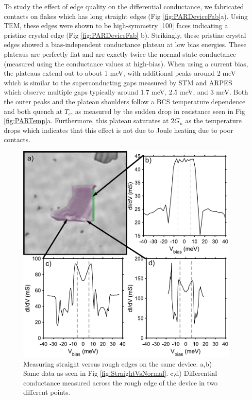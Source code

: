 To study the effect of edge quality on the differential conductance, we fabricated contacts on flakes which has long straight edges (Fig \ref{fig:PARDeviceFab}a). Using TEM, these edges were shown to be high-symmetry [100] faces indicating a pristine crystal edge (Fig \ref{fig:PARDeviceFab} b). Strikingly, these pristine crystal edges showed a bias-independent conductance plateau at low bias energies. These plateaus are perfectly flat and are exactly twice the normal-state conductance (measured using the conductance values at high-bias). When using a current bias, the plateaus extend out to about 1 meV, with additional peaks around 2 meV which is similar to the superconducting gaps measured by \ac{STM} and \ac{ARPES} which observe multiple gaps typically around 1.7 meV, 2.5 meV, and 3 meV\cite{Zhang2018, Zhu2020}. Both the outer peaks and the plateau shoulders follow a \ac{BCS} temperature dependence and both quench at $T_{c}$, as measured by the sudden drop in resistance seen in Fig \ref{fig:PARTemp}a. Furthermore, this plateau saturates at $2G_{n}$ as the temperature drops which indicates that this effect is not due to Joule heating due to poor contacts.\par
\begin{figure}
	\centering
	\includegraphics[width=\textwidth]{Chap4/Figures/ControlFlake.pdf}
	\caption{Measuring straight versus rough edges on the same device. a,b) Same data as seen in Fig \ref{fig:StraightVsNormal}. c,d) Differential conductance measured across the rough edge of the device in two different points.}
	\label{fig:ControlDevice}
\end{figure}
